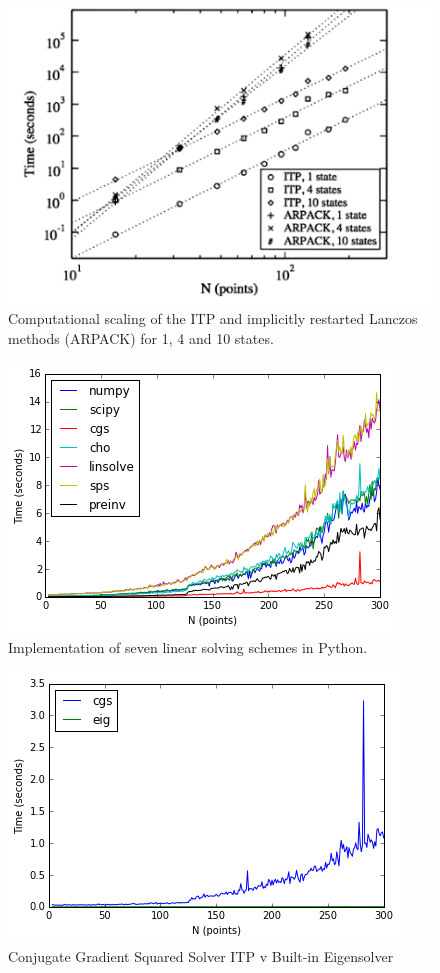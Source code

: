 \documentclass[12pt,]{book}
\begin{document}
\begin{figure}[htbp]
\centering
\includegraphics{graphics/itpvlanc.png}
\caption{Computational scaling of the ITP and implicitly restarted
Lanczos methods (ARPACK) for 1, 4 and 10 states.}
\end{figure}

\begin{figure}[htbp]
\centering
\includegraphics{graphics/analysis_9_1.png}
\caption{Implementation of seven linear solving schemes in Python.}
\end{figure}

\begin{figure}[htbp]
\centering
\includegraphics{graphics/analysis_10_1.png}
\caption{Conjugate Gradient Squared Solver ITP v Built-in Eigensolver}
\end{figure}
\end{document}
